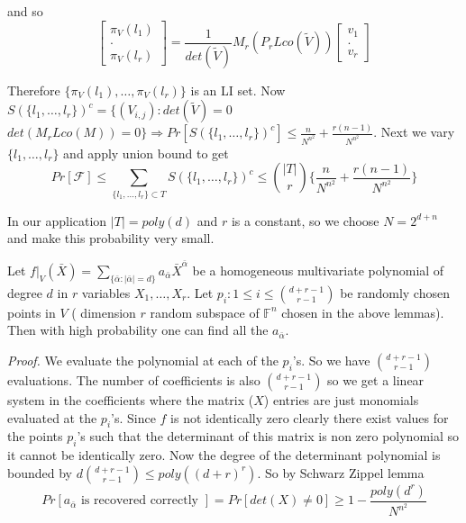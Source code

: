 \documentclass[letterpaper,USenglish,numberwithinsect]{lipics}
\newcommand{\F}{\mathbb{F}}
\newcommand{\B}[1]{\bar{#1}}
\begin{document}
and so
\[
 \begin{bmatrix}
    \pi_V(l_1) \\
    . \\
    \pi_V(l_r)
\end{bmatrix} =  \frac{1}{det(\tilde V)}M_r(P_rLco(\tilde V))  \begin{bmatrix}
    v_1 \\
    . \\
    v_r
\end{bmatrix}
\]

Therefore $\{\pi_V(l_1),\ldots ,\pi_V(l_r)\}$ is an LI set. Now $S(\{l_1,\ldots,l_r\})^c = \{ (V_{i,j}) : det(\tilde V)=0$  $det(M_rLco(M))=0 \} \Rightarrow
Pr[S(\{l_1,\ldots,l_r\})^c] \leq \frac{n}{N^{n^2}} + \frac{r(n-1)}{N^{n^2}}$. Next we vary $\{l_1,\ldots,l_r\}$ and apply union bound to get
\[
 Pr[\mathcal{F}] \leq \sum\limits_{\{l_1,\ldots,l_r\}\subset T}S(\{l_1,\ldots,l_r\})^c \leq {|T|\choose r}\{\frac{n}{N^{n^2}} + \frac{r(n-1)}{N^{n^2}}\}
\]

In our application $|T|=poly(d)$ and $r$ is a constant, so we choose $N=2^{d+n}$ and make this probability very small.



\begin{lemma}\label{lagrangeinterp}
Let $f|_{V}(\B{X}) = \sum\limits_{\{\B{\alpha} :
|\B{\alpha}|=d\}}a_{\B{\alpha}}\B{X}^{\B{\alpha}}$ be a homogeneous multivariate
polynomial of degree $d$ in $r$ variables $X_1,\ldots,X_r$. Let $p_i : 1\leq i
\leq {d+r-1 \choose r-1}$
be randomly chosen points in $V$ ( dimension $r$ random subspace of $\F^n$ chosen in the above lemmas).
Then with high probability one can
find all the $a_{\B{\alpha}}$.
\end{lemma}
\emph{Proof.}
We evaluate the polynomial at each of the $p_i$'s. So we have ${d+r-1 \choose
r-1}$ evaluations.
The number of coefficients is also ${d+r-1 \choose r-1}$ so we get a linear
system in the coefficients where the
matrix ($X$) entries are just monomials evaluated at the $p_i$'s. Since $f$ is
not identically zero clearly there exist values for the points $p_i$'s such that
the determinant of this matrix is non zero polynomial so it cannot be
identically zero. Now the degree of the determinant polynomial is bounded by
$d{d+r-1 \choose r-1} \leq poly((d+r)^{r})$.
So by Schwarz Zippel lemma
\[
Pr[a_{\B{\alpha}} \text{ is recovered correctly }] = Pr[det(X)\neq 0] \geq
1-\frac{poly(d^r)}{N^{n^2}}
\]




\newpage










\end{document}
